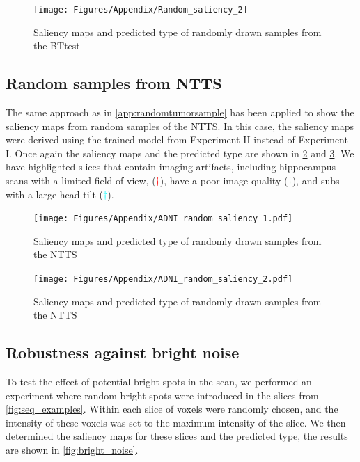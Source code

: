 \begin{subappendices}
\begin{figure}[ht]
    \centering
    \texttt{[image: Figures/Appendix/Random\_saliency\_2]}

    \caption{Saliency maps and predicted \gls{type} of randomly drawn \glspl{sample} from the \gls{BTtest}}
    \label{fig:random_2}
\end{figure}


\clearpage

\subsection{Random samples from \gls{NTTS}}
The same approach as in \cref{app:randomtumorsample} has been applied to show the saliency maps from random samples of the \gls{NTTS}.
In this case, the saliency maps were derived using the trained model from Experiment II instead of Experiment I.
Once again the saliency maps and the predicted \gls{type} are shown in \cref{fig:random_adni_1} and \cref{fig:random_adni_2}.
We have highlighted \glspl{slice} that contain imaging artifacts, including hippocampus \glspl{scan} with a limited field of view, (\textcolor{red}{$\dagger$}), have a poor image quality (\textcolor{green}{$\dagger$}), and \glspl{sub} with a large head tilt (\textcolor{cyan}{$\dagger$}).


\begin{figure}[ht]
    \centering
    \texttt{[image: Figures/Appendix/ADNI\_random\_saliency\_1.pdf]}

    \caption{Saliency maps and predicted \gls{type} of randomly drawn \glspl{sample} from the \gls{NTTS}}
    \label{fig:random_adni_1}
\end{figure}

\begin{figure}[ht]
    \centering
    \texttt{[image: Figures/Appendix/ADNI\_random\_saliency\_2.pdf]}

    \caption{Saliency maps and predicted \gls{type} of randomly drawn \glspl{sample} from the \gls{NTTS}}
    \label{fig:random_adni_2}
\end{figure}


\clearpage


\subsection{Robustness against bright noise}

To test the effect of potential bright spots in the \gls{scan}, we performed an experiment where random bright spots were introduced in the \glspl{slice} from \cref{fig:seq_examples}.
Within each \gls{slice}  of voxels were randomly chosen, and the intensity of these voxels was set to the maximum intensity of the \gls{slice}.
We then determined the saliency maps for these slices and the predicted \gls{type}, the results are shown in \cref{fig:bright_noise}.



\end{subappendices}
